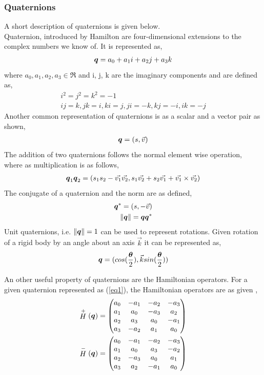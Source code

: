 \documentclass[a4paper,12pt]{article}
\newcommand{\Hp}{\ensuremath{\stackrel{+}{H}}\xspace}
\newcommand{\Hn}{\ensuremath{\stackrel{-}{H}}\xspace}
\begin{document}
\subsubsection{Quaternions}
A short description of quaternions is given below.\\
Quaternion, introduced by Hamilton are four-dimensional extensions to the complex numbers we know of. It is represented as,
\begin{align}
	\boldsymbol{q} = a_0 + a_1 i+ a_2 j+a_3 k \label{eq1}
\end{align}
where $a_0, a_1, a_2, a_3 \in \Re$ and i, j, k are the imaginary components and are defined as, 
\begin{align}
	i^2=j^2=k^2=-1 \\
	ij=k, jk=i, ki=j, ji=-k, kj=-i, ik=-j
\end{align}
Another common representation of quaternions is as a scalar and a vector pair as shown,
\begin{align}
	\boldsymbol{q} = (s, \vec{v})
\end{align} 
The addition of two quaternions follows the normal element wise operation, where as multiplication is as follows, 
\begin{align}
	\boldsymbol{q}_1\boldsymbol{q}_2 = (s_1 s_2-\vec{v_1}\vec{v_2}, s_1\vec{v_2}+s_2\vec{v_1}+\vec{v_1}\times\vec{v_2})
\end{align}
The conjugate of a quaternion and the norm are as defined, 
\begin{align}
	\boldsymbol{q}^* = (s, -\vec{v}) \\
	\| \boldsymbol{q}\| = \boldsymbol{q}\boldsymbol{q}^*
\end{align}
Unit quaternions, i.e. $\| \boldsymbol{q}\|=1$ can be used to represent rotations. Given rotation of a rigid body by an angle \bth about an axis $\vec{k}$ it can be represented as, 
\begin{align}
	\boldsymbol{q} = (cos(\frac{\boldsymbol{\theta}}{2}), \vec{k}sin(\frac{\boldsymbol{\theta}}{2}))
\end{align}

An other useful property of quaternions are the Hamiltonian operators. For a given quaternion represented as (\ref{eq1}), the Hamiltonian operators are as given \cite{akyar2008dual},
\begin{align}
	\Hp(\bq) = \begin{pmatrix}
	a_0 & -a_1 & -a_2 & -a_3\\
	a_1 &  a_0 & -a_3 &  a_2\\
	a_2 &  a_3 &  a_0 & -a_1\\
	a_3 & -a_2 &  a_1 &  a_0\\	
	\end{pmatrix}
	\\
	\Hn(\bq) = \begin{pmatrix}
	a_0 & -a_1 & -a_2 & -a_3\\
	a_1 &  a_0 &  a_3 & -a_2\\
	a_2 & -a_3 &  a_0 &  a_1\\
	a_3 &  a_2 & -a_1 &  a_0\\	
	\end{pmatrix}
\end{align}
\end{document}
